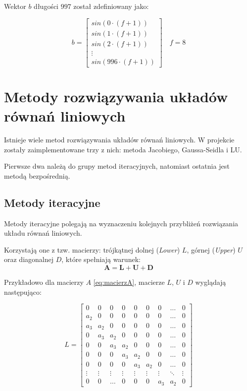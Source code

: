 \documentclass{article}
\begin{document}
Wektor $b$ długości $997$ został zdefiniowany jako:

\begin{equation}
b = \begin{bmatrix}
    sin(0 \cdot (f + 1))\\
    sin(1 \cdot (f + 1))\\
    sin(2 \cdot (f + 1))\\
    \vdots\\
    sin(996 \cdot (f + 1))
\end{bmatrix} \quad f = 8
\end{equation}

\section{Metody rozwiązywania układów równań liniowych}
Istnieje wiele metod rozwiązywania układów równań liniowych. 
W projekcie zostały zaimplementowane trzy z nich: metoda Jacobiego, Gaussa-Seidla i LU.

Pierwsze dwa należą do grupy metod iteracyjnych, 
natomiast ostatnia jest metodą bezpośrednią.

\subsection{Metody iteracyjne}
Metody iteracyjne polegają na wyznaczeniu 
kolejnych przybliżeń rozwiązania układu równań liniowych.

Korzystają one z tzw. macierzy: trójkątnej dolnej (\textit{Lower}) $L$, 
górnej (\textit{Upper}) $U$ oraz diagonalnej $D$,
które spełniają warunek:
\begin{equation}
    \boldsymbol{A = L + U + D}
\end{equation}

Przykładowo dla macierzy $A$ \eqref{eq:macierzA},
macierze $L$, $U$ i $D$ wyglądają następująco:

\begin{equation}
L = \begin{bmatrix}
    0 & 0 & 0 & 0 & 0 & 0 & 0 & \dots & 0\\
    a_2 & 0 & 0 & 0 & 0 & 0 & 0 & \dots & 0\\
    a_3 & a_2 & 0 & 0 & 0 & 0 & 0 & \dots & 0\\
    0 & a_3 & a_2 & 0 & 0 & 0 & 0 & \dots & 0\\
    0 & 0 & a_3 & a_2 & 0 & 0 & 0 & \dots & 0\\
    0 & 0 & 0 & a_3 & a_2 & 0 & 0 & \dots & 0\\
    0 & 0 & 0 & 0 & a_3 & a_2 & 0 & \dots & 0\\
    \vdots & \vdots & \vdots & \vdots & \vdots & \vdots & \vdots & \ddots & \vdots\\
    0 & 0 & \dots & 0 & 0 & 0 & a_3 & a_2 & 0
\end{bmatrix}
\end{equation}
\end{document}
